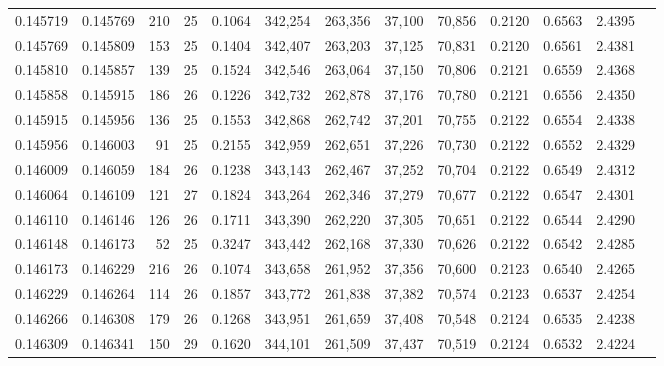 \begin{tabular}{rrrrrrrrrrrrr}
0.145719 & 0.145769 & 210 &  25 &                                     0.1064 & 342,254 & 263,356 &  37,100 &  70,856 & 0.2120 & 0.6563 & 2.4395 \\
0.145769 & 0.145809 & 153 &  25 &                                     0.1404 & 342,407 & 263,203 &  37,125 &  70,831 & 0.2120 & 0.6561 & 2.4381 \\
0.145810 & 0.145857 & 139 &  25 &                                     0.1524 & 342,546 & 263,064 &  37,150 &  70,806 & 0.2121 & 0.6559 & 2.4368 \\
0.145858 & 0.145915 & 186 &  26 &                                     0.1226 & 342,732 & 262,878 &  37,176 &  70,780 & 0.2121 & 0.6556 & 2.4350 \\
0.145915 & 0.145956 & 136 &  25 &                                     0.1553 & 342,868 & 262,742 &  37,201 &  70,755 & 0.2122 & 0.6554 & 2.4338 \\
0.145956 & 0.146003 &  91 &  25 &                                     0.2155 & 342,959 & 262,651 &  37,226 &  70,730 & 0.2122 & 0.6552 & 2.4329 \\
0.146009 & 0.146059 & 184 &  26 &                                     0.1238 & 343,143 & 262,467 &  37,252 &  70,704 & 0.2122 & 0.6549 & 2.4312 \\
0.146064 & 0.146109 & 121 &  27 &                                     0.1824 & 343,264 & 262,346 &  37,279 &  70,677 & 0.2122 & 0.6547 & 2.4301 \\
0.146110 & 0.146146 & 126 &  26 &                                     0.1711 & 343,390 & 262,220 &  37,305 &  70,651 & 0.2122 & 0.6544 & 2.4290 \\
0.146148 & 0.146173 &  52 &  25 &                                     0.3247 & 343,442 & 262,168 &  37,330 &  70,626 & 0.2122 & 0.6542 & 2.4285 \\
0.146173 & 0.146229 & 216 &  26 &                                     0.1074 & 343,658 & 261,952 &  37,356 &  70,600 & 0.2123 & 0.6540 & 2.4265 \\
0.146229 & 0.146264 & 114 &  26 &                                     0.1857 & 343,772 & 261,838 &  37,382 &  70,574 & 0.2123 & 0.6537 & 2.4254 \\
0.146266 & 0.146308 & 179 &  26 &                                     0.1268 & 343,951 & 261,659 &  37,408 &  70,548 & 0.2124 & 0.6535 & 2.4238 \\
0.146309 & 0.146341 & 150 &  29 &                                     0.1620 & 344,101 & 261,509 &  37,437 &  70,519 & 0.2124 & 0.6532 & 2.4224 \\

\end{tabular}
